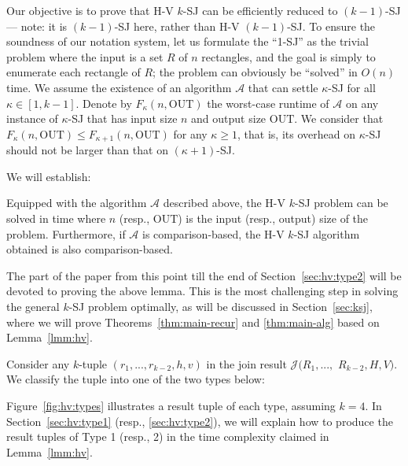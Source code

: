 \documentclass[acmsmall,review,anonymous]{acmart}
\def\vgap{\vspace{1mm}}
\def\A{\mathcal{A}}
\def\J{\mathcal{J}}
\def\out{\mathrm{OUT}}
\begin{document}
\vgap

Our objective is to prove that H-V $k$-SJ can be efficiently reduced to $(k-1)$-SJ --- note: it is $(k-1)$-SJ here, rather than H-V $(k-1)$-SJ. To ensure the soundness of our notation system, let us formulate the ``1-SJ'' as the trivial problem where the input is a set $R$ of $n$ rectangles, and the goal is simply to enumerate each rectangle of $R$; the problem can obviously be ``solved'' in $O(n)$ time. We assume the existence of an algorithm $\A$ that can settle $\kappa$-SJ for all $\kappa \in [1, k-1]$. Denote by $F_\kappa(n, \out)$ the worst-case runtime of $\A$ on any instance of $\kappa$-SJ that has input size $n$ and output size $\out$. We consider that $F_\kappa(n, \out) \le F_{\kappa + 1}(n, \out)$ for any $\kappa \ge 1$, that is, its overhead on $\kappa$-SJ should not be larger than that on $(\kappa+1)$-SJ.

\vgap

We will establish:

\begin{lemma} \label{lmm:hv}
    Equipped with the algorithm $\A$ described above, the H-V $k$-SJ problem can be solved in
    \myeqn{
        O(k) \cdot \big( F_{k-1}(n, \out) + n\log n + k \cdot \out \big) \nn
    }
    time where $n$ (resp., $\out$) is the input (resp., output) size of the problem. Furthermore, if $\A$ is comparison-based, the H-V $k$-SJ algorithm obtained is also comparison-based.
\end{lemma}

The part of the paper from this point till the end of Section~\ref{sec:hv:type2} will be devoted to proving the above lemma. This is the most challenging step in solving the general $k$-SJ problem optimally, as will be discussed in Section~\ref{sec:ksj}, where we will prove Theorems~\ref{thm:main-recur} and \ref{thm:main-alg} based on Lemma~\ref{lmm:hv}.

\vgap



Consider any $k$-tuple $(r_1, ..., r_{k-2}, h, v)$ in the join result $\J(R_1, ...,$ $R_{k-2}, H, V)$. We classify the tuple into one of the two types below:

Figure~\ref{fig:hv:types} illustrates a result tuple of each type, assuming $k = 4$. In Section~\ref{sec:hv:type1} (resp., \ref{sec:hv:type2}), we will explain how to produce the result tuples of Type 1 (resp., 2) in the time complexity claimed in Lemma~\ref{lmm:hv}.
\end{document}
